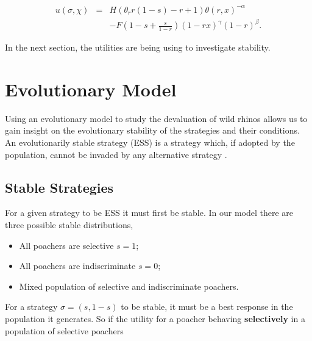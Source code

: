 \documentclass[10pt]{article}
\begin{document}
\begin{eqnarray}
\label{eqn:tutility2}
u(\sigma, \chi) &=&
H (\theta_r r(1-s) - r + 1)\theta(r,x)^{-\alpha} \\ \nonumber &&
- F\left(1-s + \frac{s}{1-r} \right)(1-rx)^{\gamma}(1-r)^{\beta} .
\end{eqnarray}

In the next section, the utilities are being using to investigate stability.

\section{Evolutionary Model}\label{section:evolutionary_model}

Using an evolutionary model to study the devaluation of wild rhinos allows us 
to gain insight on the evolutionary stability of the strategies and their conditions.
An evolutionarily stable strategy (ESS) is a strategy which, if adopted by the 
population, cannot be invaded by any alternative strategy 
\cite{nowak2006evolutionary}.

\subsection{Stable Strategies}\label{subsection:stable_strategies}

For a given strategy to be ESS it must first be stable.
In our model there are three possible stable distributions, 

\begin{itemize} 
	\item All poachers are selective \(s=1\);
	\item All poachers are indiscriminate \(s=0\);
	\item Mixed population of selective and indiscriminate poachers.
\end{itemize}

For a strategy \(\sigma=(s, 1- s)\) to be stable, it must be a best response in 
the population it generates.  So if the utility for a poacher behaving 
\textbf{selectively} in a population of selective poachers
\end{document}
